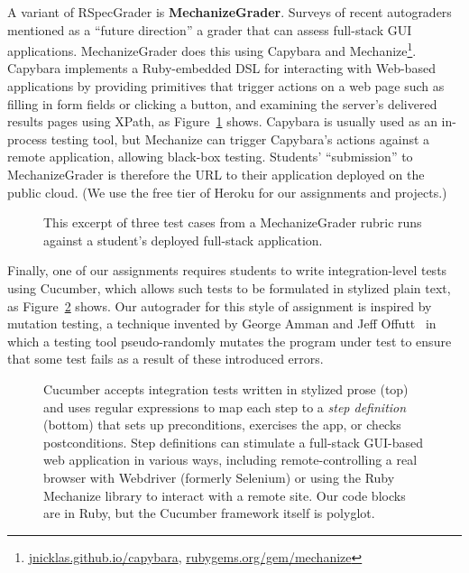 A variant of RSpecGrader is \textbf{MechanizeGrader}.
Surveys of recent
autograders~\cite{ihantola-2010-autograding-survey,douce-2005-autograding-survey}
mentioned as a ``future direction'' a grader that can assess full-stack
GUI applications.
MechanizeGrader does this using Capybara and
Mechanize\footnote{\url{jnicklas.github.io/capybara},
\url{rubygems.org/gem/mechanize}}.
Capybara implements a Ruby-embedded DSL for interacting with Web-based
applications by providing primitives that trigger actions on a web page
such as filling in form fields or clicking a button, and examining the
server's delivered results pages using XPath, as
Figure~\ref{fig:mechanize_grader_example} shows. 
Capybara is usually used as an in-process testing tool, but Mechanize
can trigger Capybara's actions against a remote application, allowing
black-box testing.
Students' ``submission'' to MechanizeGrader is therefore the URL to their
application deployed on the public 
cloud.  (We use the free tier of Heroku for our assignments and
projects.)

\begin{figure}
 \centering
  
  \caption{\label{fig:mechanize_grader_example} 
This excerpt of three test cases from a MechanizeGrader rubric runs
against a student's 
deployed full-stack application.}
\end{figure}

Finally, one of our assignments requires students to write integration-level
tests using Cucumber, which allows such tests to be formulated in
stylized plain text, as Figure~\ref{fig:cucumber} shows.
Our autograder for this
style of assignment is inspired by mutation testing, a technique invented
by George Amman and Jeff 
Offutt~\cite{ammann-offutt-sw-testing} in which a
testing tool pseudo-randomly mutates the program under test to ensure
that some test fails as a result of these introduced errors.

\begin{figure}
  \centering
    
  \caption{\label{fig:cucumber} Cucumber accepts integration tests 
    written in stylized prose (top) and uses regular expressions to map each
    step to a \emph{step definition} (bottom) that sets up preconditions, exercises the app,
    or checks postconditions.  Step definitions 
    can stimulate a full-stack GUI-based web application in various
    ways, including remote-controlling a real browser with Webdriver
    (formerly Selenium) or using the Ruby Mechanize library to interact
    with a remote site.  Our code blocks are in Ruby, but the Cucumber framework
itself is polyglot.} 
\end{figure}

